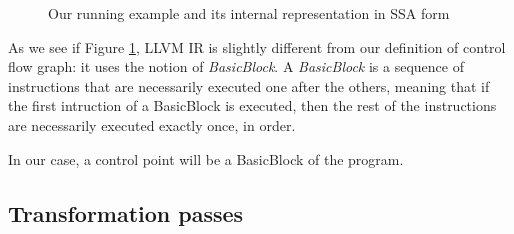 \documentclass[a4paper,english,titlepage,11pt]{report}
\begin{document}
\begin{figure}[!h]
\begin{minipage}[c]{.69\linewidth}
{
}


\end{minipage}
\caption{Our running example and its internal representation in SSA form}
\label{IR}
\end{figure}
\FloatBarrier

As we see if Figure \ref{IR}, LLVM IR is slightly different from
our definition of control flow graph: it uses the notion of \emph{BasicBlock}.
A \emph{BasicBlock} is a sequence of instructions that are necessarily executed
one after the others, meaning that if the first intruction of a BasicBlock is
executed, then the rest of the instructions are necessarily executed exactly
once, in order.

In our case, a control point will be a BasicBlock of the program.

\subsection{Transformation passes}
\end{document}
